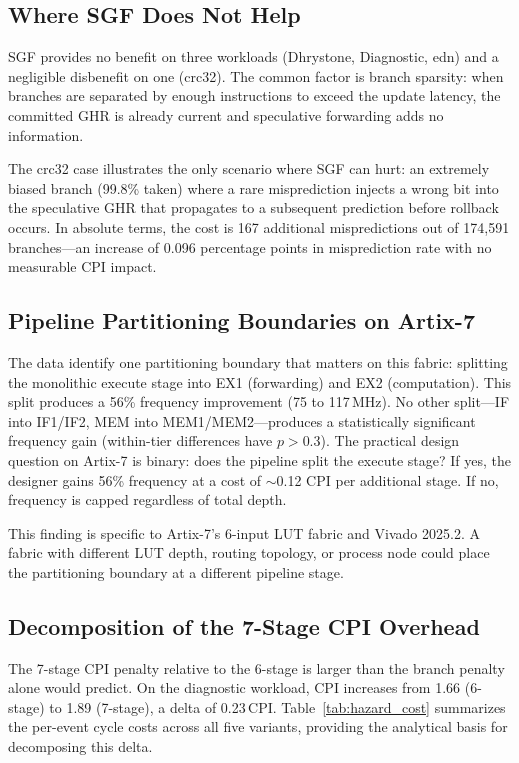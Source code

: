 \documentclass[journal]{IEEEtran}
\begin{document}
\begin{table}[t]
\begin{table}[t]
\begin{table}[t]
\begin{table}[t]
\begin{table}[t]
\begin{table}[t]
\subsection{Where SGF Does Not Help}

SGF provides no benefit on three workloads (Dhrystone, Diagnostic, edn) and a negligible disbenefit on one (crc32). The common factor is branch sparsity: when branches are separated by enough instructions to exceed the update latency, the committed GHR is already current and speculative forwarding adds no information.

The crc32 case illustrates the only scenario where SGF can hurt: an extremely biased branch (99.8\% taken) where a rare misprediction injects a wrong bit into the speculative GHR that propagates to a subsequent prediction before rollback occurs. In absolute terms, the cost is 167 additional mispredictions out of 174{,}591 branches---an increase of 0.096 percentage points in misprediction rate with no measurable CPI impact.

\subsection{Pipeline Partitioning Boundaries on Artix-7}

The data identify one partitioning boundary that matters on this fabric: splitting the monolithic execute stage into EX1 (forwarding) and EX2 (computation). This split produces a 56\% frequency improvement (75 to 117\,MHz). No other split---IF into IF1/IF2, MEM into MEM1/MEM2---produces a statistically significant frequency gain (within-tier differences have $p > 0.3$). The practical design question on Artix-7 is binary: does the pipeline split the execute stage? If yes, the designer gains 56\% frequency at a cost of $\sim$0.12 CPI per additional stage. If no, frequency is capped regardless of total depth.

This finding is specific to Artix-7's 6-input LUT fabric and Vivado 2025.2. A fabric with different LUT depth, routing topology, or process node could place the partitioning boundary at a different pipeline stage.

\subsection{Decomposition of the 7-Stage CPI Overhead}

The 7-stage CPI penalty relative to the 6-stage is larger than the branch penalty alone would predict. On the diagnostic workload, CPI increases from 1.66 (6-stage) to 1.89 (7-stage), a delta of 0.23\,CPI. Table~\ref{tab:hazard_cost} summarizes the per-event cycle costs across all five variants, providing the analytical basis for decomposing this delta.


\end{table}
\end{table}
\end{table}
\end{table}
\end{table}
\end{table}
\end{document}
